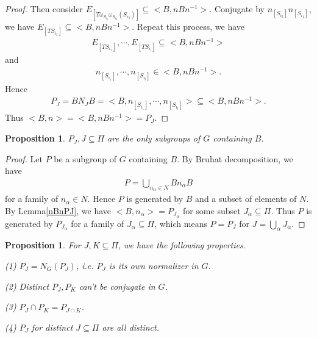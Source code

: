 \documentclass[12pt]{amsart}
\newtheorem{proposition}[theorem]{Proposition}
\begin{document}
\begin{proof}
    Then consider $E_{[T\omega_{S_{i_1}} \omega_{S_{i_2}} (S_{i_3})]} \subseteq  <B,nBn^{-1}>$.
    Conjugate by $n_{[S_{i_2}]}n_{[S_{i_1}]}$, we have $E_{[TS_{i_3}]} \subseteq  <B,nBn^{-1}>$.
    Repeat this process, we have
    \begin{align*}
    E_{[TS_{i_1}]},\cdots,E_{[TS_{i_l}]}\subseteq  <B,nBn^{-1}>
    \end{align*} 
    and
    \begin{align*}
        n_{[S_{i_1}]},\cdots,n_{[S_{i_l}]}\in <B,nBn^{-1}>.
    \end{align*}
    Hence 
    \begin{align*}
        P_J = BN_JB = <B,n_{[S_{i_1}]},\cdots,n_{[S_{i_l}]}> \subseteq  <B,nBn^{-1}>.
    \end{align*}
    Thus $<B,n> = <B,nBn^{-1}> = P_J$.
\end{proof}

\begin{proposition}\label{PJonly}
    $P_J,J\subseteq \Pi$ are the only subgroups of $G$ containing $B$.
\end{proposition}

\begin{proof}
    Let $P$ be a subgroup of $G$ containing $B$. 
    By Bruhat decomposition, we have 
    \begin{align*}
        P=\bigcup\limits_{n_{\alpha}\in N} Bn_{\alpha}B
    \end{align*}
    for a family of $n_{\alpha} \in N$.
    Hence $P$ is generated by $B$ and a subset of elements of $N$.
    By Lemma\ref{nBnPJ}, we have $<B,n_{\alpha}> = P_{J_{\alpha}}$ for some subset $J_{\alpha} \subseteq  \Pi$.
    Thus $P$ is generated by $P_{J_{\alpha}}$ for a family of  $J_{\alpha} \subseteq  \Pi$, 
    which means $P=P_J$ for $J=\bigcup\limits_{\alpha} J_{\alpha}$.
\end{proof}

\begin{proposition}\label{PJproperties}
    For $J,K\subseteq \Pi$, we have the following properties.

   (1) $P_J = N_G(P_J)$, i.e. $P_J$ is its own normalizer in $G$. 

   (2) Distinct $P_J,P_K$ can't be conjugate in $G$.

   (3) $P_J \cap P_K = P_{J\cap K}$.

   (4) $P_J$ for distinct $J\subseteq  \Pi $ are all distinct.
\end{proposition}
\end{document}
